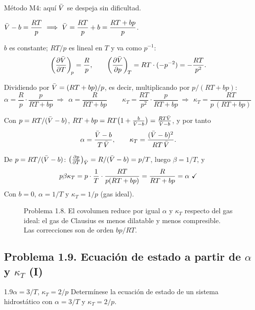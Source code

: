 \begin{resolucion}
\idea Método M4: aquí $\bar{V}$ se despeja sin dificultad.

 $\displaystyle\Vm-b=\frac{RT}{p}\ \Longrightarrow\ \Vm=\frac{RT}{p}+b=\frac{RT+bp}{p}$.

 $b$ es constante; $RT/p$ es lineal en $T$ y va como $p^{-1}$:
\[
  \left(\frac{\partial \bar{V}}{\partial T}\right)_{\!p}=\frac{R}{p},\qquad\left(\frac{\partial \bar{V}}{\partial p}\right)_{\!T}=RT\cdot(-p^{-2})=-\frac{RT}{p^2}.
\]

 Dividiendo por $\bar{V}=(RT+bp)/p$, es decir, multiplicando por $p/(RT+bp)$:
\[
  \alpha=\frac{R}{p}\cdot\frac{p}{RT+bp}\ \Longrightarrow\ \boxed{\,\alpha=\frac{R}{RT+bp}\,}\qquad
  \kappa_T=\frac{RT}{p^2}\cdot\frac{p}{RT+bp}\ \Longrightarrow\ \boxed{\,\kappa_T=\frac{RT}{p\,(RT+bp)}\,}
\]

 Con $p=RT/(\bar{V}-b)$,
$RT+bp=RT\bigl(1+\frac{b}{\bar{V}-b}\bigr)=\frac{RT\bar{V}}{\bar{V}-b}$, y por tanto
\[
  \alpha=\frac{\bar{V}-b}{T\,\bar{V}},\qquad\kappa_T=\frac{(\bar{V}-b)^2}{RT\,\bar{V}}.
\]

 De $p=RT/(\bar{V}-b)$: $\bigl(\tfrac{\partial p}{\partial T}\bigr)_{\bar{V}}=R/(\bar{V}-b)=p/T$, luego $\beta=1/T$, y
\[
  p\beta\kappa_T=p\cdot\frac1T\cdot\frac{RT}{p(RT+bp)}=\frac{R}{RT+bp}=\alpha\ \checkmark
\]
Con $b=0$, $\alpha=1/T$ y $\kappa_T=1/p$ (gas ideal).
\end{resolucion}

\begin{figure}[htbp]
\centering
{}
\caption{Problema 1.8. El covolumen reduce por igual $\alpha$ y $\kappa_T$ respecto del gas ideal: el gas
de Clausius es menos dilatable y menos compresible. Las correcciones son de orden $bp/RT$.}
\label{fig:p18}
\end{figure}

\subsection{Problema 1.9. Ecuación de estado a partir de \texorpdfstring{$\alpha$}{alpha} y \texorpdfstring{$\kappa_T$}{kappa} (I)}
\begin{problema}{1.9}{$\alpha=3/T$, $\kappa_T=2/p$}
Determínese la ecuación de estado de un sistema hidrostático con $\alpha=3/T$ y $\kappa_T=2/p$.
\end{problema}

